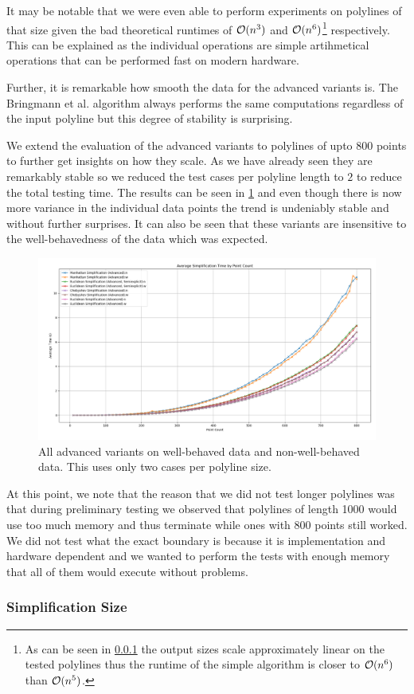 It may be notable that we were even able to perform experiments on polylines of that size given the bad theoretical runtimes of \(\mathcal{O}(n^3)\) and \(\mathcal{O}(n^6)\)\footnote{As can be seen in \cref{ssubsec:simplification_size} the output sizes scale approximately linear on the tested polylines thus the runtime of the simple algorithm is closer to \(\mathcal{O}(n^6)\) than \(\mathcal{O}(n^5)\).} respectively. This can be explained as the individual operations are simple artihmetical operations that can be performed fast on modern hardware.

Further, it is remarkable how smooth the data for the advanced variants is. The Bringmann et al. algorithm always performs the same computations regardless of the input polyline but this degree of stability is surprising. 

We extend the evaluation of the advanced variants to polylines of upto 800 points to further get insights on how they scale. As we have already seen they are remarkably stable so we reduced the test cases per polyline length to \(2\) to reduce the total testing time. The results can be seen in \cref{fig:res_advanced800} and even though there is now more variance in the individual data points the trend is undeniably stable and without further surprises. It can also be seen that these variants are insensitive to the well-behavedness of the data which was expected. 

\begin{figure}[b]
  \centering
	\includegraphics[scale=0.4]{./figures/res_advanced800.png}
  \caption{All advanced variants on well-behaved data and non-well-behaved data. This uses only two cases per polyline size.}
  \label{fig:res_advanced800}
\end{figure}

At this point, we note that the reason that we did not test longer polylines was that during preliminary testing we observed that polylines of length 1000 would use too much memory and thus terminate while ones with 800 points still worked. We did not test what the exact boundary is because it is implementation and hardware dependent and we wanted to perform the tests with enough memory that all of them would execute without problems. 


\subsubsection{Simplification Size}
\label{ssubsec:simplification_size}

